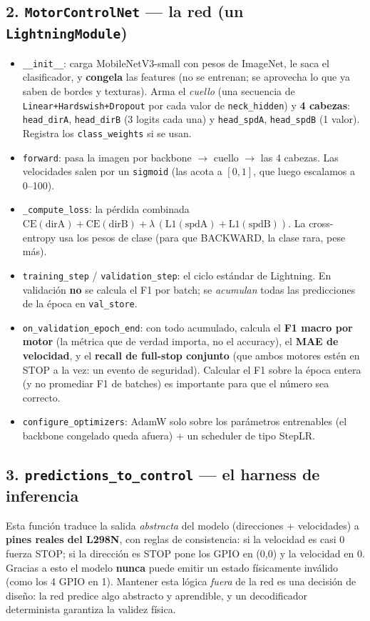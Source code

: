 \documentclass[11pt,a4paper]{article}
\newcommand{\code}[1]{\lstinline[basicstyle=\ttfamily\normalsize]|#1|}
\begin{document}
\subsection*{2. \texttt{MotorControlNet} --- la red (un \texttt{LightningModule})}
\begin{itemize}
  \item \code{__init__}: carga MobileNetV3-small con pesos de ImageNet, le saca el clasificador, y
  \textbf{congela} las features (no se entrenan; se aprovecha lo que ya saben de bordes y texturas). Arma el
  \emph{cuello} (una secuencia de \code{Linear+Hardswish+Dropout} por cada valor de \code{neck_hidden}) y
  \textbf{4 cabezas}: \code{head_dirA}, \code{head_dirB} (3 logits cada una) y \code{head_spdA}, \code{head_spdB}
  (1 valor). Registra los \code{class_weights} si se usan.
  \item \code{forward}: pasa la imagen por backbone $\rightarrow$ cuello $\rightarrow$ las 4 cabezas. Las
  velocidades salen por un \code{sigmoid} (las acota a $[0,1]$, que luego escalamos a 0--100).
  \item \code{_compute_loss}: la pérdida combinada
  $\text{CE}(\text{dirA}) + \text{CE}(\text{dirB}) + \lambda\,(\text{L1}(\text{spdA}) + \text{L1}(\text{spdB}))$.
  La cross-entropy usa los pesos de clase (para que BACKWARD, la clase rara, pese más).
  \item \code{training_step} / \code{validation_step}: el ciclo estándar de Lightning. En validación
  \textbf{no} se calcula el F1 por batch; se \emph{acumulan} todas las predicciones de la época en
  \code{val_store}.
  \item \code{on_validation_epoch_end}: con todo acumulado, calcula el \textbf{F1 macro por motor} (la métrica
  que de verdad importa, no el accuracy), el \textbf{MAE de velocidad}, y el \textbf{recall de full-stop
  conjunto} (que ambos motores estén en STOP a la vez: un evento de seguridad). Calcular el F1 sobre la época
  entera (y no promediar F1 de batches) es importante para que el número sea correcto.
  \item \code{configure_optimizers}: AdamW solo sobre los parámetros entrenables (el backbone congelado queda
  afuera) + un scheduler de tipo StepLR.
\end{itemize}

\subsection*{3. \texttt{predictions\_to\_control} --- el harness de inferencia}
Esta función traduce la salida \emph{abstracta} del modelo (direcciones + velocidades) a \textbf{pines reales
del L298N}, con reglas de consistencia: si la velocidad es casi 0 fuerza STOP; si la dirección es STOP pone los
GPIO en (0,0) y la velocidad en 0. Gracias a esto el modelo \textbf{nunca} puede emitir un estado físicamente
inválido (como los 4 GPIO en 1). Mantener esta lógica \emph{fuera} de la red es una decisión de diseño: la red
predice algo abstracto y aprendible, y un decodificador determinista garantiza la validez física.
\end{document}
